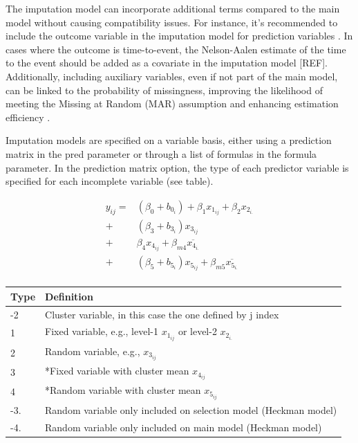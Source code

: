 \documentclass[
  article]{jss}
\begin{document}
The imputation model can incorporate additional terms compared to the
main model without causing compatibility issues. For instance, it's
recommended to include the outcome variable in the imputation model for
prediction variables \cite{moons2006a}. In cases where the outcome is
time-to-event, the Nelson-Aalen estimate of the time to the event should
be added as a covariate in the imputation model {[}REF{]}. Additionally,
including auxiliary variables, even if not part of the main model, can
be linked to the probability of missingness, improving the likelihood of
meeting the Missing at Random (MAR) assumption and enhancing estimation
efficiency \cite{hardt2012a}.

Imputation models are specified on a variable basis, either using a
prediction matrix in the pred parameter or through a list of formulas in
the formula parameter. In the prediction matrix option, the type of each
predictor variable is specified for each incomplete variable (see
table).

\begin{align}
y_{ij} =& (\beta_0 + b_{0_i})+ \beta_1x_{1_{ij}}+\beta_2x_{2_{i.}} \nonumber \\
+& (\beta_3 +  b_{3_i})x_{3_{ij}} \nonumber \\
+& \beta_4x_{4_{ij}} + \beta_{m4}\overline{x_{4_{i.}}}\nonumber \\
+& (\beta_5 +  b_{5_i})x_{5_{ij}} +\beta_{m5}\overline{x_{5_{i.}}}\nonumber \\
\end{align}

\begin{tabular}{ll}
     \toprule
Type & Definition \\
  \midrule
-2  & Cluster variable, in this case the one defined by j index  \\
 1  & Fixed variable, e.g., level-1  $x_{1_{ij}}$ or  level-2 $x_{2_{i.}}$ \\
 2  & Random variable, e.g., $x_{3_{ij}}$\\
 3  & *Fixed variable with cluster mean $x_{4_{ij}}$\\
 4  & *Random variable with cluster mean $x_{5_{ij}}$\\
-3. & Random variable only included on selection model (Heckman model)\\
-4. & Random variable only included on main model (Heckman model)\\
      \bottomrule
\end{tabular}
\end{document}
